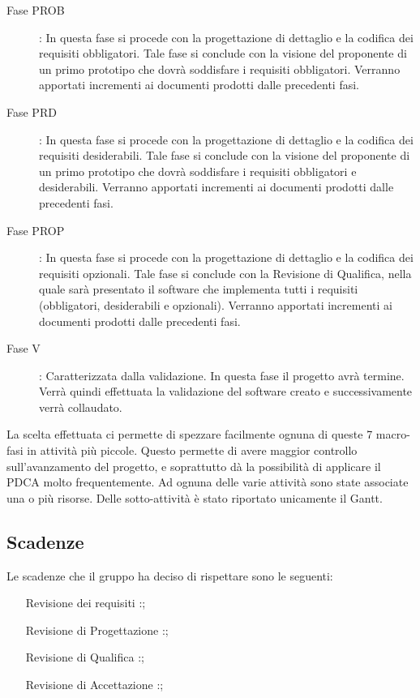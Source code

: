 \begin{description}
			\item[Fase PROB]: In questa fase si procede con la progettazione di dettaglio e la codifica dei requisiti obbligatori. Tale fase si conclude con la visione del proponente di un primo prototipo che dovrà soddisfare i requisiti obbligatori. Verranno apportati incrementi ai documenti prodotti dalle precedenti fasi.
			\item[Fase PRD]: In questa fase si procede con la progettazione di dettaglio e la codifica dei requisiti desiderabili. Tale fase si conclude con la visione del proponente di un primo prototipo che dovrà soddisfare i requisiti obbligatori e desiderabili. Verranno apportati incrementi ai documenti prodotti dalle precedenti fasi.
			\item[Fase PROP]: In questa fase si procede con la progettazione di dettaglio e la codifica dei requisiti opzionali. Tale fase si conclude con la Revisione di Qualifica, nella quale sarà presentato il software che implementa tutti i requisiti (obbligatori, desiderabili e opzionali). Verranno apportati incrementi ai documenti prodotti dalle precedenti fasi.
			\item[Fase V]: Caratterizzata dalla validazione. In questa fase il progetto avrà termine. Verrà  quindi effettuata la validazione del software creato e successivamente verrà collaudato.
		\end{description}
		La scelta effettuata ci permette di spezzare facilmente ognuna di queste 7 macro-fasi in attività più piccole. Questo permette di avere maggior controllo sull’avanzamento del progetto, e soprattutto dà la possibilità di applicare il PDCA molto frequentemente.
		Ad ognuna delle varie attività sono state associate una o più risorse. Delle sotto-attività è stato riportato unicamente il Gantt.
	\subsection{Scadenze}
		Le scadenze che il gruppo \groupname ha deciso di rispettare sono le seguenti:
		\begin{itemize}
			\item[Revisione dei requisiti]:;
			\item[Revisione di Progettazione]:;
			\item[Revisione di Qualifica]:;
			\item[Revisione di Accettazione]:;
		\end{itemize}
